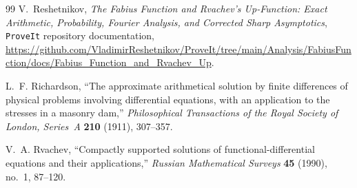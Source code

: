 \documentclass[11pt,oneside]{article}
\theoremstyle{plain}
\theoremstyle{definition}
\theoremstyle{remark}
\begin{document}
\begin{thebibliography}{99}
V.~Reshetnikov,
\emph{The Fabius Function and Rvachev's Up-Function: Exact Arithmetic,
Probability, Fourier Analysis, and Corrected Sharp Asymptotics},
\texttt{ProveIt} repository documentation,
\url{https://github.com/VladimirReshetnikov/ProveIt/tree/main/Analysis/FabiusFunction/docs/Fabius_Function_and_Rvachev_Up}.

L.~F. Richardson,
``The approximate arithmetical solution by finite differences of physical
problems involving differential equations, with an application to the
stresses in a masonry dam,''
\emph{Philosophical Transactions of the Royal Society of London, Series~A}
\textbf{210} (1911), 307--357.

V.~A. Rvachev,
``Compactly supported solutions of functional-differential equations and
their applications,''
\emph{Russian Mathematical Surveys} \textbf{45} (1990), no.~1, 87--120.

\end{thebibliography}
\end{document}
